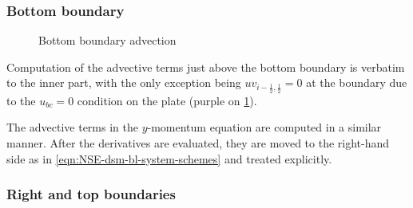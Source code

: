 \documentclass{article}
\numberwithin{equation}{section}
\begin{document}
\subsubsection{Bottom boundary}\label{subsubsec:advection-bottom}
\begin{figure}[H] %
  \caption{Bottom boundary advection}\label{fig:ADV-bottom}
\end{figure}
Computation of the advective terms just above the bottom boundary is verbatim to the inner part, with the only exception being $uv_{i-\frac{1}{2},\frac{1}{2}}=0$ at the boundary due to the $u_{bc}=0$ condition on the plate (purple on \cref{fig:ADV-bottom}).

The advective terms in the $y$-momentum equation are computed in a similar manner. After the derivatives are evaluated, they are moved to the right-hand side as in \cref{eqn:NSE-dsm-bl-system-schemes} and treated explicitly. 

\subsubsection{Right and top boundaries}\label{subsubsec:advection-right}
\end{document}
